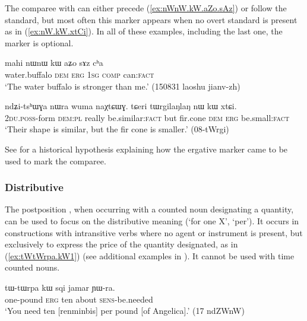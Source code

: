 The comparee with   can either precede (\ref{ex:nWnW.kW.aZo.sAz}) or follow the standard, but most often this marker appears when no overt standard is present as in (\ref{ex:nW.kW.xtCi}). In all of these examples, including the last one, the marker    is optional.

\begin{exe}
\ex \label{ex:nWnW.kW.aZo.sAz}
 \gll mahi nɯnɯ kɯ aʑo sɤz cʰa \\ 
water.buffalo \textsc{dem} \textsc{erg} \textsc{1sg} \textsc{comp} can:\textsc{fact} \\ 
\glt `The water buffalo is stronger than me.'  (150831 laoshu jianv-zh)
\end{exe}

\begin{exe}
\ex \label{ex:nW.kW.xtCi}
\gll ndʑi-tsʰɯɣa nɯra wuma naχtɕɯɣ. tɕeri tɯrgilaŋlaŋ nɯ kɯ xtɕi. \\
\textsc{2du}.\textsc{poss}-form \textsc{dem}:\textsc{pl} really be.similar:\textsc{fact} but fir.cone \textsc{dem} \textsc{erg} be.small:\textsc{fact} \\
\glt  `Their shape is similar, but the fir cone is smaller.' (08-tWrgi) 
\end{exe}

See \citet{jacques16comparative} for a historical hypothesis explaining how the ergative marker came to be used to mark the comparee. 

\subsubsection{Distributive} \label{sec:distributive.kW}
 
The postposition , when occurring with a counted noun designating a quantity, can be used to focus on the distributive meaning (`for one X', `per'). It occurs in constructions with intransitive verbs where no agent or instrument is present, but exclusively to express the price of the quantity designated, as in  (\ref{ex:tWtWrpa.kW1}) (see additional examples in \citealt[5--6]{jacques16comparative}). It cannot be used with time counted nouns.

 \begin{exe} 
\ex \label{ex:tWtWrpa.kW1}
\gll  tɯ-tɯrpa kɯ sqi jamar ɲɯ-ra. \\
one-pound \textsc{erg} ten about \textsc{sens}-be.needed \\
\glt `You need ten [renminbis] per pound [of Angelica].' (17 ndZWnW)
\end{exe}  

